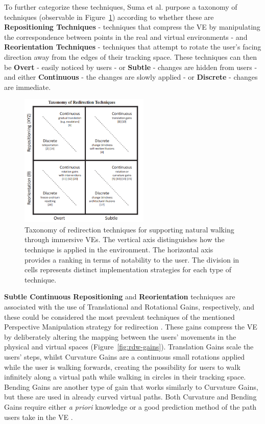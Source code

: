 To further categorize these techniques, Suma et al.\cite{6180877} purpose a taxonomy of techniques (observable in Figure~\ref{fig:rdw-taxonomy}) 
according to whether these 
are \textbf{Repositioning Techniques} - techniques that compress the \gls{VE} by manipulating the correspondence between points in the real 
and virtual environments - and \textbf{Reorientation Techniques} - techniques that attempt to rotate the user's facing direction away from 
the edges of their tracking space. These techniques can then be \textbf{Overt} - easily noticed by users - or \textbf{Subtle} - changes are 
hidden from users - and either \textbf{Continuous} - the changes are slowly applied - or \textbf{Discrete} - changes are immediate.
\begin{figure}[t]
    \centering
    \includegraphics[width=0.55\textwidth]{NOVAthesisFiles/Images/papers/rdw-taxonomy.png}
    \caption{ Taxonomy of redirection techniques for supporting natural
    walking through immersive \glspl{VE}. The vertical axis
    distinguishes how the technique is applied in the environment. The
    horizontal axis provides a ranking in terms of notability to the user.
    The division in cells represents distinct implementation strategies for
    each type of technique. \cite{6180877}}
    \label{fig:rdw-taxonomy}
\end{figure}

\textbf{Subtle Continuous Repositioning} and \textbf{Reorientation} techniques are associated with the use of Translational and 
Rotational Gains, respectively, and these could be considered the most prevalent techniques of the mentioned 
Perspective Manipulation strategy for redirection \cite{Nilsson2018}. These gains compress the \gls{VE} by deliberately altering the 
mapping between the users' movements in the physical and virtual spaces (Figure~\ref{fig:rdw-gains}). 
Translation Gains scale the users' steps, whilst Curvature 
Gains are a continuous small rotations applied while the user is walking forwards, creating the possibility for users to walk infinitely 
along a virtual path while walking in circles in their tracking space. Bending Gains are another type of gain that works similarly to 
Curvature Gains, but these are used in already curved virtual paths. Both Curvature and Bending Gains require either \textit{a priori} 
knowledge or a good prediction method of the path users take in the \gls{VE} \cite{8255772}.

